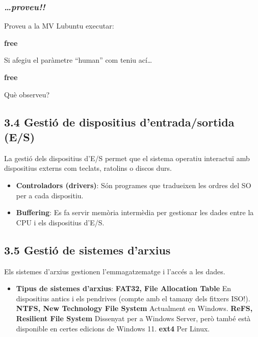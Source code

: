 \documentclass[
  a4paper,
]{article}
\newenvironment{Shaded}{\begin{snugshade}}{\end{snugshade}}
\newcommand{\FunctionTok}[1]{\textcolor[rgb]{0.13,0.29,0.53}{\textbf{#1}}}
\providecommand{\tightlist}{%
  \setlength{\itemsep}{0pt}\setlength{\parskip}{0pt}}
\begin{document}
\subsubsection{\texorpdfstring{\textbf{\emph{\ldots proveu!!}}}{\ldots proveu!!}}\label{proveu-1}

Proveu a la MV Lubuntu executar:

\begin{Shaded}
\begin{Highlighting}[]
\FunctionTok{free}
\end{Highlighting}
\end{Shaded}

Si afegiu el paràmetre ``human'' com teniu ací\ldots{}

\begin{Shaded}
\begin{Highlighting}[]
\FunctionTok{free}
\end{Highlighting}
\end{Shaded}

Què observeu?

\subsection{3.4 Gestió de dispositius d'entrada/sortida
(E/S)}\label{gestiuxf3-de-dispositius-dentradasortida-es}

La gestió dels dispositius d'E/S permet que el sistema operatiu
interactuï amb dispositius externs com teclats, ratolins o discos durs.

\begin{itemize}
\item
  \textbf{Controladors (drivers)}: Són programes que tradueixen les
  ordres del SO per a cada dispositiu.
\item
  \textbf{Buffering}: Es fa servir memòria intermèdia per gestionar les
  dades entre la CPU i els dispositius d'E/S.
\end{itemize}

\subsection{3.5 Gestió de sistemes
d'arxius}\label{gestiuxf3-de-sistemes-darxius}

Els sistemes d'arxius gestionen l'emmagatzematge i l'accés a les dades.

\begin{itemize}
\tightlist
\item
  \textbf{Tipus de sistemes d'arxius}: \textbf{FAT32, File Allocation
  Table} En dispositius antics i els pendrives (compte amb el tamany
  dels fitxers ISO!). \textbf{NTFS, New Technology File System}
  Actualment en Windows. \textbf{ReFS, Resilient File System} Dissenyat
  per a Windows Server, però també està disponible en certes edicions de
  Windows 11. \textbf{ext4} Per Linux.
\end{itemize}
\end{document}
